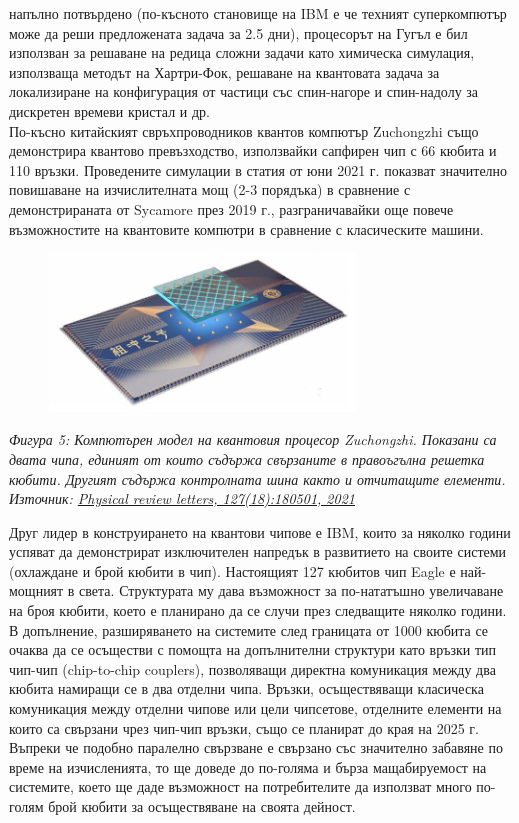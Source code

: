     напълно потвърдено (по-късното становище на IBM е че техният суперкомпютър може да реши предложената задача за 2.5 дни), процесорът на Гугъл е бил използван за решаване на редица сложни задачи като химическа симулация,
    използваща методът на Хартри-Фок, решаване на квантовата задача за локализиране на конфигурация от частици със спин-нагоре и спин-надолу за дискретен времеви кристал и др.\\
    По-късно китайският свръхпроводников квантов компютър Zuchongzhi също демонстрира квантово превъзходство, използвайки сапфирен чип с 66 кюбита и 110 връзки. Проведените симулации в статия от юни 2021 г. \cite{wu2021strong} 
    показват значително повишаване на изчислителната мощ (2-3 порядъка) в сравнение с демонстрираната от Sycamore през 2019 г., разграничавайки още повече възможностите на квантовите компютри в сравнение с класическите машини.\\

    \begin{figure}[H]
        \centering
        \includegraphics[width=230pt]{8.jpg}
    \end{figure}
    \begin{center}
        \small \textit{Фигура 5: Компютърен модел на квантовия процесор Zuchongzhi. Показани са двата чипа, единият от които съдържа свързаните в правоъгълна решетка кюбити. Другият съдържа контролната шина както и отчитащите елементи.\\
        Източник: \href{https://journals.aps.org/prl/abstract/10.1103/PhysRevLett.127.180501}{Physical review letters, 127(18):180501, 2021}}\cite{wu2021strong}
    \end{center}

    Друг лидер в конструирането на квантови чипове е IBM, които за няколко години успяват да демонстрират изключителен напредък в развитието на своите системи (охлаждане и брой кюбити в чип). Настоящият 127 кюбитов чип Eagle
    е най-мощният в света. Структурата му дава възможност за по-нататъшно увеличаване на броя кюбити, което е планирано да се случи през следващите няколко години. В допълнение, разширяването на системите след границата от 1000
    кюбита се очаква да се осъществи с помощта на допълнителни структури като връзки тип чип-чип (chip-to-chip couplers), позволяващи директна комуникация между два кюбита намиращи се в два отделни чипа. Връзки, осъществяващи
    класическа комуникация между отделни чипове или цели чипсетове, отделните елементи на които са свързани чрез чип-чип връзки, също се планират до края на 2025 г. Въпреки че подобно паралелно свързване е свързано със значително
    забавяне по време на изчисленията, то ще доведе до по-голяма и бърза мащабируемост на системите, което ще даде възможност на потребителите да използват много по-голям брой кюбити за осъществяване на своята дейност.

